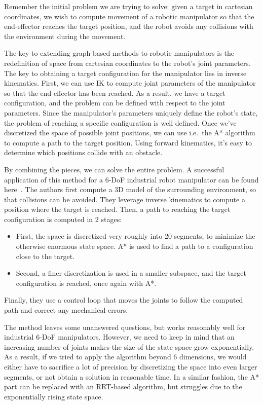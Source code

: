 Remember the initial problem we are trying to solve: given a target in cartesian coordinates, we wish to compute movement of a robotic manipulator so that the end-effector reaches the target position, and the robot avoids any collisions with the environment during the movement.

The key to extending graph-based methods to robotic manipulators is the redefinition of space from cartesian coordinates to the robot's joint parameters. The key to obtaining a target configuration for the manipulator lies in inverse kinematics. First, we can use IK to compute joint parameters of the manipulator so that the end-effector has been reached. As a result, we have a target configuration, and the problem can be defined with respect to the joint parameters.
Since the manipulator's parameters uniquely define the robot's state, the problem of reaching a specific configuration is well defined. Once we've discretized the space of possible joint positions, we can use i.e.\ the A* algorithm to compute a path to the target position. Using forward kinematics, it's easy to determine which positions collide with an obstacle.

By combining the pieces, we can solve the entire problem. A successful application of this method for a 6-DoF industrial robot manipulator can be found here~\cite{doubleA_star}. The authors first compute a 3D model of the surrounding environment, so that collisions can be avoided. They leverage inverse kinematics to compute a position where the target is reached. Then, a path to reaching the target configuration is computed in 2 stages:

\begin{itemize}
\item First, the space is discretized very roughly into 20 segments, to minimize the otherwise enormous state space. A* is used to find a path to a configuration close to the target.
\item Second, a finer discretization is used in a smaller subspace, and the target configuration is reached, once again with A*.
\end{itemize}

Finally, they use a control loop that moves the joints to follow the computed path and correct any mechanical errors.

The method leaves some unanswered questions, but works reasonably well for industrial 6-DoF manipulators. However, we need to keep in mind that an increasing number of joints makes the size of the state space grow exponentially. As a result, if we tried to apply the algorithm beyond 6 dimensions, we would either have to sacrifice a lot of precision by discretizing the space into even larger segments, or not obtain a solution in reasonable time. In a similar fashion, the A* part can be replaced with an RRT-based algorithm, but struggles due to the exponentially rising state space.

